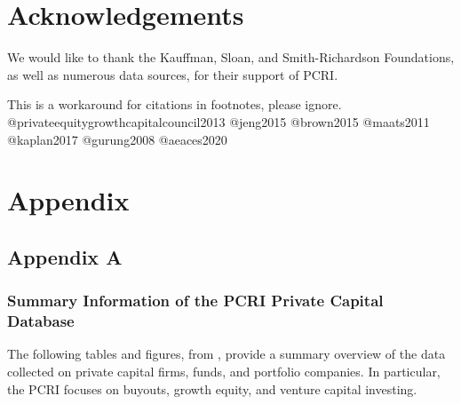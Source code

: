 \hypertarget{acknowledgements-1}{%
\section*{Acknowledgements}\label{acknowledgements-1}}

We would like to thank the Kauffman, Sloan, and Smith-Richardson Foundations, as well as numerous data sources, for their support of PCRI.

\begin{invisible}
This is a workaround for citations in footnotes, please ignore.
@privateequitygrowthcapitalcouncil2013 @jeng2015 @brown2015 @maats2011
@kaplan2017 @gurung2008 @aeaces2020
\end{invisible}

\putbib

\FloatBarrier\newpage

\hypertarget{appendix-3}{%
\section*{Appendix}\label{appendix-3}}

\hypertarget{appendix-a-1}{%
\subsection*{Appendix A}\label{appendix-a-1}}

\hypertarget{summary-information-of-the-pcri-private-capital-database}{%
\subsubsection*{Summary Information of the PCRI Private Capital Database}\label{summary-information-of-the-pcri-private-capital-database}}

The following tables and figures, from \citet{jeng2015}, provide a summary overview of the data collected on private capital firms, funds, and portfolio companies. In particular, the PCRI focuses on buyouts, growth equity, and venture capital investing.













\FloatBarrier\newpage

